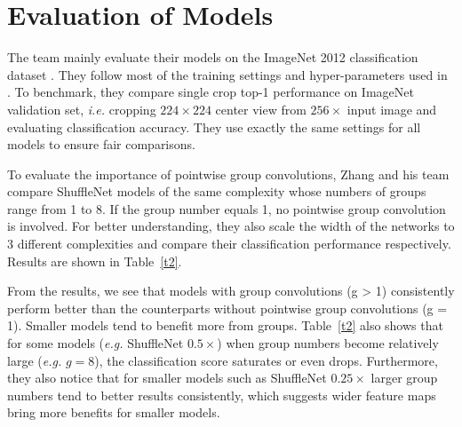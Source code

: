 \documentclass[10pt,twocolumn,letterpaper]{article}
\begin{document}
\section{Evaluation of Models}

The team mainly evaluate their models on the ImageNet 2012 classification dataset \cite{russakovsky2015imagenet}. They follow most of the training settings and hyper-parameters used in \cite{xie2017aggregated}. To benchmark, they compare single crop top-1 performance on ImageNet validation set, \emph{i.e.} cropping $224\times 224$ center view from $256\times$ input image and evaluating classification accuracy. They use exactly the same settings for all models to ensure fair comparisons.

To evaluate the importance of pointwise group convolutions, Zhang and his team compare ShuffleNet models of the same complexity whose numbers of groups range from 1 to 8. If the group number equals 1, no pointwise group convolution is involved. For better understanding, they also scale the width of the networks to 3 different complexities and compare their classification performance respectively. Results are shown in Table~\ref{t2}.

From the results, we see that models with group convolutions (g > 1) consistently perform better than the counterparts without pointwise group convolutions (g = 1). Smaller models tend to benefit more from groups. Table~\ref{t2} also shows that for some models (\emph{e.g.} ShuffleNet $0.5 \times$) when group numbers become relatively large (\emph{e.g.} $g = 8$), the classification score saturates or even drops. Furthermore, they also notice that for smaller models such as ShuffleNet $0.25\times$ larger group numbers tend to better results consistently, which suggests wider feature maps bring more benefits for smaller models.



{\small


}
\end{document}
